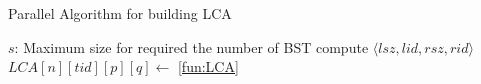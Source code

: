\begin{algorithm*}[!thb]
  \caption{Parallel Algorithm for building LCA}
  \label{alg:parallel-LCA}
  \begin{algorithmic}[1]
    \Require
      $s$: Maximum size for required the number of BST
          \State compute $\langle\mathit{lsz},\mathit{lid},\mathit{rsz},\mathit{rid}\rangle$
            \State $\textit{LCA}[n][\mathit{tid}][p][q] \gets$ \ref{fun:LCA}
          \EndFor
        \EndParFor
      \EndParFor
    \EndFor
  \end{algorithmic}
\end{algorithm*}